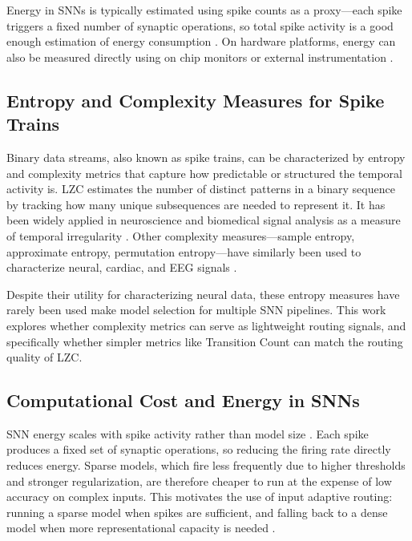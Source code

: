 \documentclass[conference]{IEEEtran}
\begin{document}
Energy in SNNs is typically estimated using spike counts as a proxy—each spike triggers a fixed number of synaptic operations, so total spike activity is a good enough estimation of energy consumption \cite{maass1997thirdgen}. On hardware platforms, energy can also be measured directly using on chip monitors or external instrumentation \cite{akopyan2015truenorth}.

\subsection{Entropy and Complexity Measures for Spike Trains}

Binary data streams, also known as spike trains, can be characterized by entropy and complexity metrics that capture how predictable or structured the temporal activity is. LZC estimates the number of distinct patterns in a binary sequence by tracking how many unique subsequences are needed to represent it. It has been widely applied in neuroscience and biomedical signal analysis as a measure of temporal irregularity \cite{amigo2004entropySNN}. Other complexity measures—sample entropy, approximate entropy, permutation entropy—have similarly been used to characterize neural, cardiac, and EEG signals \cite{nicolaou2012eeg, costa2002multiscaleEntropy, pincus1991approxEntropy}.

Despite their utility for characterizing neural data, these entropy measures have rarely been used make model selection for multiple SNN pipelines. This work explores whether complexity metrics can serve as lightweight routing signals, and specifically whether simpler metrics like Transition Count can match the routing quality of LZC.

\subsection{Computational Cost and Energy in SNNs}

SNN energy scales with spike activity rather than model size \cite{maass1997thirdgen}. Each spike produces a fixed set of synaptic operations, so reducing the firing rate directly reduces energy. Sparse models, which fire less frequently due to higher thresholds and stronger regularization, are therefore cheaper to run at the expense of low accuracy on complex inputs. This motivates the use of input adaptive routing: running a sparse model when spikes are sufficient, and falling back to a dense model when more representational capacity is needed \cite{teerapittayanon2016branchynet}.
\end{document}
